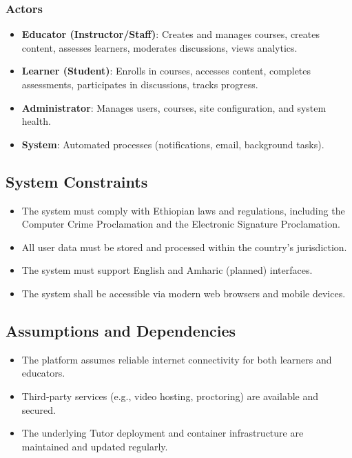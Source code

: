 \subsubsection{Actors}
\begin{itemize}
    \item \textbf{Educator (Instructor/Staff)}: Creates and manages courses, creates content, assesses learners, moderates discussions, views analytics.
    \item \textbf{Learner (Student)}: Enrolls in courses, accesses content, completes assessments, participates in discussions, tracks progress.
    \item \textbf{Administrator}: Manages users, courses, site configuration, and system health.
    \item \textbf{System}: Automated processes (notifications, email, background tasks).
\end{itemize}

\subsection{System Constraints}
\begin{itemize}
    \item The system must comply with Ethiopian laws and regulations, including the Computer Crime Proclamation and the Electronic Signature Proclamation.
    \item All user data must be stored and processed within the country's jurisdiction.
    \item The system must support English and Amharic (planned) interfaces.
    \item The system shall be accessible via modern web browsers and mobile devices.
\end{itemize}

\subsection{Assumptions and Dependencies}
\begin{itemize}
    \item The platform assumes reliable internet connectivity for both learners and educators.
    \item Third‑party services (e.g., video hosting, proctoring) are available and secured.
    \item The underlying Tutor deployment and container infrastructure are maintained and updated regularly.
\end{itemize}


